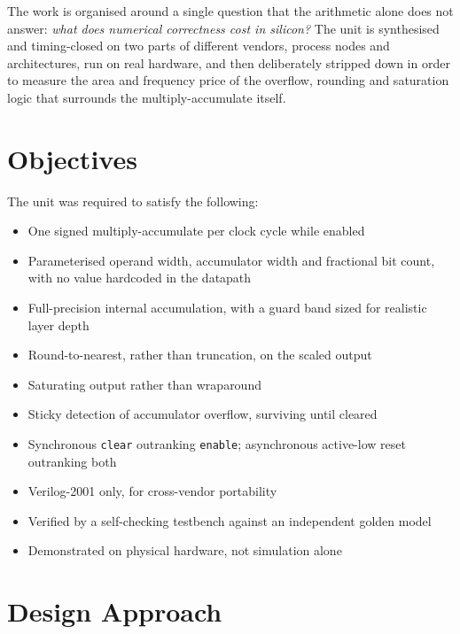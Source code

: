 \documentclass[letterpaper,12pt]{article}
\begin{document}
The work is organised around a single question that the arithmetic alone does
not answer: \emph{what does numerical correctness cost in silicon?} The unit is
synthesised and timing-closed on two parts of different vendors, process nodes
and architectures, run on real hardware, and then deliberately stripped down in
order to measure the area and frequency price of the overflow, rounding and
saturation logic that surrounds the multiply-accumulate itself.

\section{Objectives}

The unit was required to satisfy the following:

\begin{itemize}
    \item One signed multiply-accumulate per clock cycle while enabled
    \item Parameterised operand width, accumulator width and fractional bit count, with no value hardcoded in the datapath
    \item Full-precision internal accumulation, with a guard band sized for realistic layer depth
    \item Round-to-nearest, rather than truncation, on the scaled output
    \item Saturating output rather than wraparound
    \item Sticky detection of accumulator overflow, surviving until cleared
    \item Synchronous \texttt{clear} outranking \texttt{enable}; asynchronous active-low reset outranking both
    \item Verilog-2001 only, for cross-vendor portability
    \item Verified by a self-checking testbench against an independent golden model
    \item Demonstrated on physical hardware, not simulation alone
\end{itemize}

\section{Design Approach}
\end{document}
